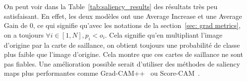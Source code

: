 On peut voir dans la Table~\ref{tab:saliency_results} des résultats très peu satisfaisant. En effet, les deux modèles ont une Average Increase et une Average Gain de 0, ce qui signifie qu'avec les notations de la section~\ref{sec: grad metrics}, on a toujours $\forall i \in [1, N], p_i < o_i$. Cela signifie qu'en multipliant l'image d'origine par la carte de saillance, on obtient toujours une probabilité de classe plus faible que l'image d'origine. Cela montre que ces cartes de saillance ne sont pas fiables. Une amélioration possible serait d'utiliser des méthodes de saliency maps plus performantes comme Grad-CAM++~\cite{gradcam++} ou Score-CAM~\cite{scorecam}.
